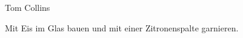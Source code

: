 \begin{recipe}{Tom Collins}{}{}

  \freeform{}\textit{}


  Mit Eis im Glas bauen und mit einer Zitronenspalte garnieren.

  \freeform{}\hrulefill{}

\end{recipe}
